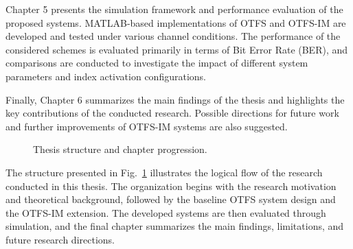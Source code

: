 Chapter 5 presents the simulation framework and performance evaluation of the proposed systems. MATLAB-based implementations of OTFS and OTFS-IM are developed and tested under various channel conditions. The performance of the considered schemes is evaluated primarily in terms of Bit Error Rate (BER), and comparisons are conducted to investigate the impact of different system parameters and index activation configurations.

Finally, Chapter 6 summarizes the main findings of the thesis and highlights the key contributions of the conducted research. Possible directions for future work and further improvements of OTFS-IM systems are also suggested.

\begin{figure}[H]
    \centering

    \caption{Thesis structure and chapter progression.}
    \label{fig:thesis_organization}
\end{figure}

The structure presented in Fig.~\ref{fig:thesis_organization} illustrates the logical flow of the research conducted in this thesis. The organization begins with the research motivation and theoretical background, followed by the baseline OTFS system design and the OTFS-IM extension. The developed systems are then evaluated through simulation, and the final chapter summarizes the main findings, limitations, and future research directions.

\newpage
